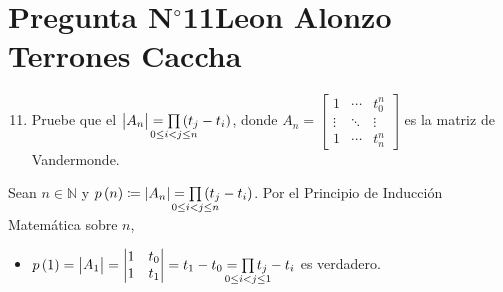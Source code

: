 \section{Pregunta N$^{\circ}$11\qquad Leon Alonzo Terrones Caccha}



\begin{frame}
	\begin{enumerate}\setcounter{enumi}{10}
		\item

		      Pruebe que el
		      \begin{math}
			      \begin{vmatrix}
				      A_{n}
			      \end{vmatrix}=
			      \prod\limits_{\mathclap{0\leq i< j\leq n}}
			      \left(t_{j}-t_{i}\right)
		      \end{math},
		      donde
		      \begin{math}
			      A_{n}=
			      \begin{bmatrix}
				      1      & \cdots & t_{0}^{n} \\
				      \vdots & \ddots & \vdots    \\
				      1      & \cdots & t_{n}^{n}
			      \end{bmatrix}
		      \end{math}
		      es la matriz de Vandermonde.
	\end{enumerate}

	\begin{solution}
		Sean $n\in\mathbb{N}$ y
		\begin{math}
			p\left(n\right)\coloneqq
			\left|A_{n}\right|=
			\prod\limits_{\mathclap{0\leq i< j\leq n}}
			\left(t_{j}-t_{i}\right)
		\end{math}.
		Por el \alert{Principio de Inducción Matemática} sobre $n$,

		\begin{itemize}
			\item

			      \begin{math}
				      p\left(1\right)=
				      \begin{vmatrix}
					      A_{1}
				      \end{vmatrix}=
				      \begin{vmatrix}
					      1 & t_{0} \\
					      1 & t_{1}
				      \end{vmatrix}=
				      t_{1}-t_{0}=
				      \prod\limits_{\mathclap{0\leq i< j\leq 1}}
				      t_{j}-t_{i}
			      \end{math}
			      es verdadero.


\end{itemize}
\end{solution}
\end{frame}
